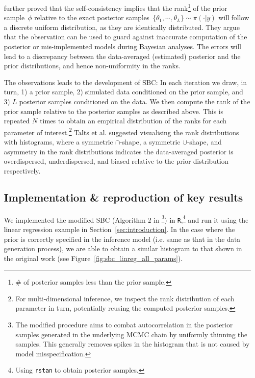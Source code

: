 \documentclass[twoside]{article}
\begin{document}
\citep{talts2018validating} further proved that the self-consistency implies that the rank\footnote{\# of posterior samples less than the prior sample.} of the prior sample~$\phi$ relative to the exact posterior samples~${\{\theta_1, \cdots, \theta_L\} \sim \pi(\cdot | y)}$ will follow a discrete uniform distribution, as they are identically distributed.
They argue that the observation can be used to guard against inaccurate computation of the posterior or mis-implemented models during Bayesian analyses. The errors will lead to a discrepancy between the data-averaged (estimated) posterior and the prior distributions, and hence non-uniformity in the ranks.

The observations leads to the development of SBC: In each iteration we draw, in turn, 1) a prior sample, 2) simulated data conditioned on the prior sample, and 3) $L$ posterior samples conditioned on the data. We then compute the rank of the prior sample relative to the posterior samples as described above. This is repeated $N$ times to obtain an empirical distribution of the ranks for each parameter of interest.\footnote{For multi-dimensional inference, we inspect the rank distribution of each parameter in turn, potentially reusing the computed posterior samples.} Talts et al. suggested visualising the rank distributions with histograms, where a symmetric $\cap$-shape, a symmetric $\cup$-shape, and asymmetry in the rank distributions indicates the data-averaged posterior is overdispersed, underdispersed, and biased relative to the prior distribution respectively.

\subsection{Implementation \& reproduction of key results}

We implemented the modified SBC (Algorithm 2 in \citep{talts2018validating}\footnote{The modified procedure aims to combat autocorrelation in the posterior samples generated in the underlying MCMC chain by uniformly thinning the samples. This generally removes spikes in the histogram that is not caused by model misspecification.}) in \texttt{R},\footnote{Using \texttt{rstan} to obtain posterior samples.} and run it using the linear regression example in Section~\ref{sec:introduction}. In the case where the prior is correctly specified in the inference model (i.e. same as that in the data generation process), we are able to obtain a similar histogram to that shown in the original work (see Figure~\ref{fig:sbc_linreg_all_params}).
\end{document}
